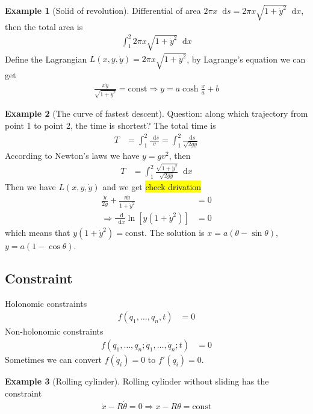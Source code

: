 \documentclass[twoside,11pt]{article}
\numberwithin{equation}{section} %
\newcommand{\lms}{\fontfamily{lmss}\selectfont} %
\renewcommand*\d{\mathop{}\!\mathrm{d}}
\theoremstyle{definition}
\newtheorem{example}{\lms Example}[section]
\theoremstyle{remark}
\begin{document}
\begin{example}[Solid of revolution]
Differential of area $2\pi x\d s = 2\pi x\sqrt{1+\dot{y}^2}\d x$,
then the total area is
\begin{align}
    \int_1^2 2\pi x\sqrt{1+\dot{y}^2}\d x
\end{align}
Define the Lagrangian $L(x, y, \dot{y}) = 2\pi x\sqrt{1+\dot{y}^2}$,
by Lagrange's equation we can get
\begin{align}
    \frac{x\dot{y}}{\sqrt{1+\dot{y}^2}} = \text{const}
    \Rightarrow y = a\cosh\frac{x}{a} + b
\end{align}
\end{example}

\begin{example}[The curve of fastest descent]
Question: along which trajectory from point 1 to point 2,
the time is shortest?
The total time is
\begin{align}
    T &= \int_1^2
    \frac{\d s}{v}
    = \int_1^2\frac{\d s}{\sqrt{2gy}}
\end{align}
According to Newton's laws we have $y=gv^2$, then
\begin{align}
    T &= \int_1^2\frac{\sqrt{1+\dot{y}^2}}{\sqrt{2gy}}\d x
\end{align}
Then we have $L(x, y, \dot{y})$ and we get \hl{check drivation}
\begin{align}
    \frac{\dot{y}}{2y} + \frac{y\ddot{y}}{1 + \dot{y}^2} &= 0\\
    \Rightarrow \frac{\d}{\d x}\ln[y(1+\dot{y}^2)] &= 0
\end{align}
which means that $y(1+\dot{y}^2)=\text{const}$.
The solution is $x=a(\theta-\sin\theta)$, $y=a(1-\cos\theta)$.
\end{example}

\subsection{Constraint}
Holonomic constraints
\begin{align}
    f(q_1,\dots,q_n,t) &= 0
\end{align}
Non-holonomic constraints
\begin{align}
    f(q_1,\dots,q_n;\dot{q}_1,\dots,\dot{q}_n;t) &= 0
\end{align}
Sometimes we can convert $f(\dot{q}_i)=0$ to $f'(q_i)=0$.
\begin{example}[Rolling cylinder]
Rolling cylinder without sliding has the constraint
\begin{align}
    \dot{x} - R\dot{\theta} = 0
    \Rightarrow x-R\theta = \text{const}
\end{align}
\tikzexternalenable
\begin{figure}[H]
    \centering
\end{figure}
\tikzexternaldisable
\end{example}
\end{document}
